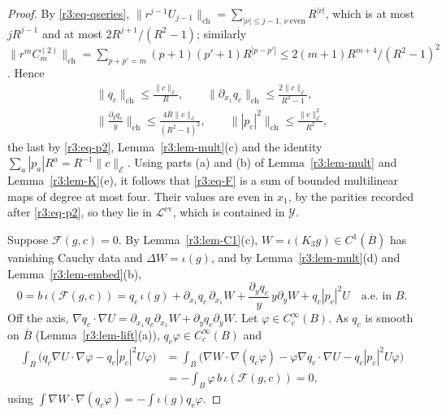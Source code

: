 \documentclass[11pt]{amsart}
\theoremstyle{definition}
\theoremstyle{remark}
\numberwithin{equation}{section}
\newcommand{\Fc}{\mathcal{F}}
\newcommand{\nrm}[1]{\lVert #1\rVert}
\begin{document}
\begin{proof}
By \eqref{r3:eq-qseries}, $\nrm{r^{j-1}U_{j-1}}_{\mathrm{ch}}=\sum_{|\nu|\leq j-1,\,\nu\ \mathrm{even}}R^{|\nu|}$, which is at most $jR^{j-1}$ and at most $2R^{j+1}/(R^2-1)$; similarly $\nrm{r^mC^{(2)}_m}_{\mathrm{ch}}=\sum_{p+p'=m}(p+1)(p'+1)R^{|p-p'|}\leq2(m+1)R^{m+4}/(R^2-1)^2$. Hence
\begin{equation}\label{r3:eq-chnorms}
\begin{gathered}
\nrm{q_c}_{\mathrm{ch}}\leq\frac{\nrm c_{\mathcal E}}R,\qquad\nrm{\partial_{x_1}q_c}_{\mathrm{ch}}\leq\frac{2\nrm c_{\mathcal E}}{R^2-1},\\
\Big\|\frac{\partial_yq_c}y\Big\|_{\mathrm{ch}}\leq\frac{4R\nrm c_{\mathcal E}}{(R^2-1)^2},\qquad\nrm{|p_c|^2}_{\mathrm{ch}}\leq\frac{\nrm c^2_{\mathcal E}}{R^2},
\end{gathered}
\end{equation}
the last by \eqref{r3:eq-p2}, Lemma~\ref{r3:lem-mult}(c) and the identity $\sum_a|p_a|R^a=R^{-1}\nrm c_{\mathcal E}$. Using parts (a) and (b) of Lemma~\ref{r3:lem-mult} and Lemma~\ref{r3:lem-K}(e), it follows that \eqref{r3:eq-F} is a sum of bounded multilinear maps of degree at most four. Their values are even in $x_1$, by the parities recorded after \eqref{r3:eq-p2}, so they lie in $\mathcal L^{\mathrm{ev}}$, which is contained in $\mathcal Y$.

Suppose $\Fc(g,c)=0$. By Lemma~\ref{r3:lem-C1}(c), $W=\iota(K_3g)\in C^1(\overline B)$ has vanishing Cauchy data and $\Delta W=\iota(g)$, and by Lemma~\ref{r3:lem-mult}(d) and Lemma~\ref{r3:lem-embed}(b),
\[
0=b\,\iota(\Fc(g,c))=q_c\,\iota(g)+\partial_{x_1}q_c\,\partial_{x_1}W+\frac{\partial_yq_c}y\,y\partial_yW+q_c|p_c|^2U\quad\text{a.e. in }B .
\]
Off the axis, $\nabla q_c\cdot\nabla U=\partial_{x_1}q_c\partial_{x_1}W+\partial_yq_c\partial_yW$. Let $\varphi\in C_c^\infty(B)$. As $q_c$ is smooth on $\overline B$ (Lemma~\ref{r3:lem-lift}(a)), $q_c\varphi\in C_c^\infty(B)$ and
\begin{align*}
\int_B\big(q_c\nabla U\cdot\nabla\varphi-q_c|p_c|^2U\varphi\big)&=\int_B\big(\nabla W\cdot\nabla(q_c\varphi)-\varphi\nabla q_c\cdot\nabla U-q_c|p_c|^2U\varphi\big)\\
&=-\int_B\varphi\,b\,\iota(\Fc(g,c))=0,
\end{align*}
using $\int\nabla W\cdot\nabla(q_c\varphi)=-\int\iota(g)q_c\varphi$.
\end{proof}
\end{document}
